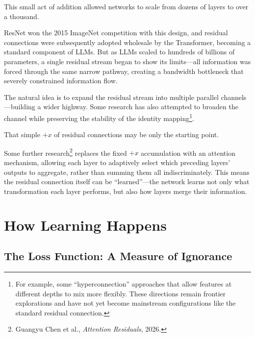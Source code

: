 

This small act of addition allowed networks to scale from dozens of layers to over a thousand.

ResNet won the 2015 ImageNet competition with this design, and residual connections were subsequently adopted wholesale by the Transformer, becoming a standard component of LLMs. But as LLMs scaled to hundreds of billions of parameters, a single residual stream began to show its limits---all information was forced through the same narrow pathway, creating a bandwidth bottleneck that severely constrained information flow.

\vspace{1em}

The natural idea is to expand the residual stream into multiple parallel channels---building a wider highway. Some research has also attempted to broaden the channel while preserving the stability of the identity mapping\footnote{For example, some ``hyperconnection'' approaches that allow features at different depths to mix more flexibly. These directions remain frontier explorations and have not yet become mainstream configurations like the standard residual connection.}.

\vspace{1em}

That simple $+x$ of residual connections may be only the starting point.

Some further research\footnote{Guangyu Chen et al., \textit{Attention Residuals}, 2026.} replaces the fixed $+x$ accumulation with an attention mechanism, allowing each layer to adaptively select which preceding layers' outputs to aggregate, rather than summing them all indiscriminately. This means the residual connection itself can be ``learned''---the network learns not only what transformation each layer performs, but also how layers merge their information.


\section{How Learning Happens}


\subsection{The Loss Function: A Measure of Ignorance}

